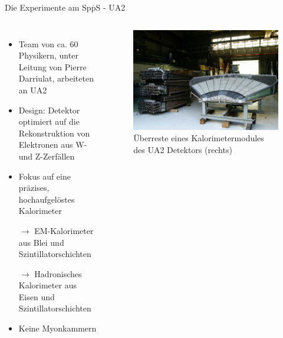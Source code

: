 \documentclass[aspectratio=1610, professionalfonts, 10pt]{beamer}
\begin{document}
\begin{frame}{Die Experimente am Sp$\overline{\text{p}}$S - UA2}
	\begin{columns}
				\begin{itemize}
					\setlength\itemsep{0.5em}
					\item Team von ca. 60 Physikern, unter Leitung von Pierre Darriulat, arbeiteten an UA2
					\item Design: Detektor optimiert auf die Rekonstruktion von Elektronen aus W- und Z-Zerfällen
					\item Fokus auf eine präzises, hochaufgelöstes Kalorimeter
					\item[$\rightarrow$] EM-Kalorimeter aus Blei und Szintillatorschichten
					\item[$\rightarrow$] Hadronisches Kalorimeter aus Eisen und Szintillatorschichten
					\item Keine Myonkammern
				\end{itemize}
			\begin{figure}
	  			\centering
				\includegraphics[width=\linewidth]{Images/Image1-Tilecal.jpg}
				\caption{Überreste eines Kalorimetermodules des UA2 Detektors (rechts) \cite{CERN-EX-8710495}}
	  			\label{fig:sad}
			\end{figure}
	\end{columns}
\end{frame}
\end{document}

